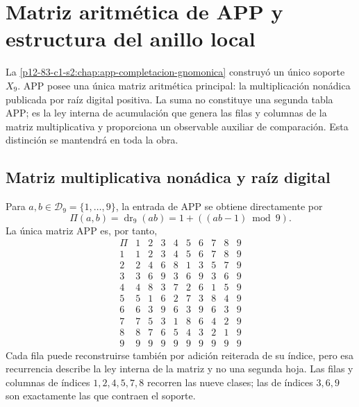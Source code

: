\label{chap:83-01}

\begingroup
\def\HMTAPPFormal{1}
\def\HMTAPPDevelopments{1}
\begin{HMTScientificOwnerSubordinated}

\end{HMTScientificOwnerSubordinated}
\endgroup


\section{Matriz aritmética de APP y estructura del anillo local}
\label{p12-83-c1-s1:chap:app-hojas-algebra-local}

La \cref{p12-83-c1-s2:chap:app-completacion-gnomonica} construyó un único soporte
\(X_9\). APP posee una única matriz aritmética principal: la multiplicación
nonádica publicada por raíz digital positiva. La suma no constituye una
segunda tabla APP; es la ley interna de acumulación que genera las filas y
columnas de la matriz multiplicativa y proporciona un observable auxiliar de
comparación. Esta distinción se mantendrá en toda la obra.

\subsection{Matriz multiplicativa nonádica y raíz digital}

Para \(a,b\in\mathcal D_9=\{1,\ldots,9\}\), la entrada de APP se obtiene
directamente por
\begin{equation}
 \boxed{\Pi(a,b)=\operatorname{dr}_9(ab)
 =1+((ab-1)\bmod9).}
 \label{p12-83-c1-s1:eq:app-matriz-multiplicativa-directa}
\end{equation}
La única matriz APP es, por tanto,
\[
\begin{array}{c|ccccccccc}
\Pi&1&2&3&4&5&6&7&8&9\\\hline
1&1&2&3&4&5&6&7&8&9\\
2&2&4&6&8&1&3&5&7&9\\
3&3&6&9&3&6&9&3&6&9\\
4&4&8&3&7&2&6&1&5&9\\
5&5&1&6&2&7&3&8&4&9\\
6&6&3&9&6&3&9&6&3&9\\
7&7&5&3&1&8&6&4&2&9\\
8&8&7&6&5&4&3&2&1&9\\
9&9&9&9&9&9&9&9&9&9
\end{array}
\]
Cada fila puede reconstruirse también por adición reiterada de su índice,
pero esa recurrencia describe la ley interna de la matriz y no una segunda
hoja. Las filas y columnas de índices \(1,2,4,5,7,8\) recorren las nueve
clases; las de índices \(3,6,9\) son exactamente las que contraen el soporte.

